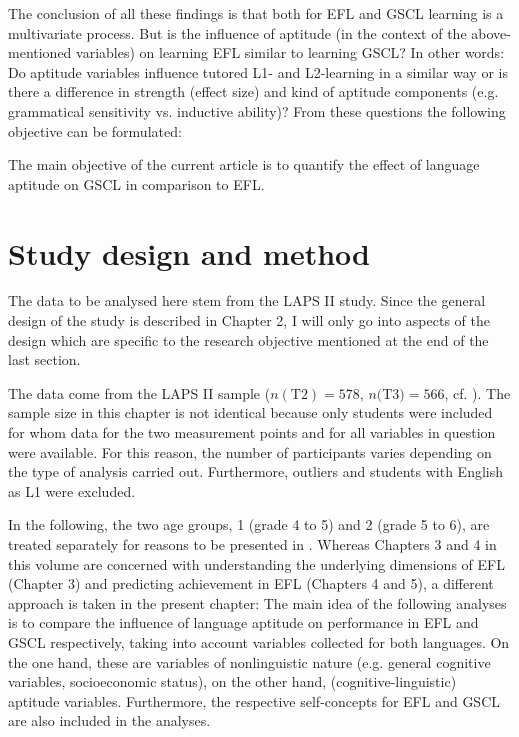 \documentclass[output=paper]{langsci/langscibook}
\begin{document}
The conclusion of all these findings is that both for EFL and GSCL learning is a multivariate process. But is the influence of aptitude (in the context of the above-mentioned variables) on learning EFL similar to learning GSCL? In other words: Do aptitude variables influence tutored L1- and L2-learning in a similar way or is there a difference in strength (effect size) and kind of aptitude components (e.g. grammatical sensitivity vs. inductive ability)? From these questions the following objective can be formulated:

The main objective of the current article is to quantify the effect of language aptitude on GSCL in comparison to EFL. 

\section{Study design and method}\label{sec:09:3}

The data to be analysed here stem from the LAPS II study. Since the general design of the study is described in Chapter 2, I will only go into aspects of the design which are specific to the research objective mentioned at the end of the last section. 

The data come from the LAPS II sample ($n(\text{T2})=578$, $n\text{(T3)}= 566$, cf. ). The sample size in this chapter is not identical because only students were included for whom data for the two measurement points and for all variables in question were available. For this reason, the number of participants varies depending on the type of analysis carried out. Furthermore, outliers and students with English as L1 were excluded.

In the following, the two age groups, 1 (grade 4 to 5) and 2 (grade 5 to 6), are treated separately for reasons to be presented in . Whereas Chapters 3 and 4 in this volume are concerned with understanding the underlying dimensions of EFL (Chapter 3) and predicting achievement in EFL (Chapters 4 and 5), a different approach is taken in the present chapter: The main idea of the following analyses is to compare the influence of language aptitude on performance in EFL and GSCL respectively, taking into account variables collected for both languages. On the one hand, these are variables of nonlinguistic nature (e.g. general cognitive variables, socioeconomic status), on the other hand, (cognitive-linguistic) aptitude variables. Furthermore, the respective self-concepts for EFL and GSCL are also included in the analyses.
\end{document}
